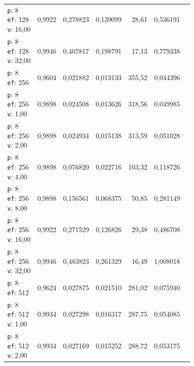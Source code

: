 \begin{table}[htbp]
\begin{tabularx}{\textwidth}{Xrrrrrr}
    \makecell{\texttt{p}: 8\\\texttt{ef}: 128\\\texttt{v}: 16,00} & 0,9922 & 0,278823 & 0,139099 & 28,61 & 0,536191 \\
    \makecell{\texttt{p}: 8\\\texttt{ef}: 128\\\texttt{v}: 32,00} & 0,9946 & 0,407817 & 0,198791 & 17,13 & 0,779338 \\
    \makecell{\texttt{p}: 8\\\texttt{ef}: 256} & 0,9604 & 0,021882 & 0,013133 & 355,52 & 0,044396 \\
    \makecell{\texttt{p}: 8\\\texttt{ef}: 256\\\texttt{v}: 1,00} & 0,9898 & 0,024508 & 0,013626 & 318,56 & 0,049985 \\
    \makecell{\texttt{p}: 8\\\texttt{ef}: 256\\\texttt{v}: 2,00} & 0,9898 & 0,024934 & 0,015138 & 313,59 & 0,051028 \\
    \makecell{\texttt{p}: 8\\\texttt{ef}: 256\\\texttt{v}: 4,00} & 0,9898 & 0,076820 & 0,022716 & 103,32 & 0,118726 \\
    \makecell{\texttt{p}: 8\\\texttt{ef}: 256\\\texttt{v}: 8,00} & 0,9898 & 0,156561 & 0,068375 & 50,85 & 0,281149 \\
    \makecell{\texttt{p}: 8\\\texttt{ef}: 256\\\texttt{v}: 16,00} & 0,9922 & 0,271529 & 0,126826 & 29,38 & 0,486708 \\
    \makecell{\texttt{p}: 8\\\texttt{ef}: 256\\\texttt{v}: 32,00} & 0,9946 & 0,483823 & 0,261329 & 16,49 & 1,008018 \\
    \makecell{\texttt{p}: 8\\\texttt{ef}: 512} & 0,9624 & 0,027875 & 0,021510 & 281,02 & 0,075940 \\
    \makecell{\texttt{p}: 8\\\texttt{ef}: 512\\\texttt{v}: 1,00} & 0,9934 & 0,027298 & 0,016317 & 287,75 & 0,054085 \\
    \makecell{\texttt{p}: 8\\\texttt{ef}: 512\\\texttt{v}: 2,00} & 0,9934 & 0,027169 & 0,015252 & 288,72 & 0,053175 \\

\end{tabularx}
\end{table}
